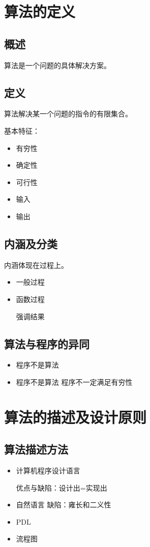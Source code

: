 \documentclass[AutoFakeBold]{LZUThesis2007}
\begin{document}
	\section{算法的定义}
		\subsection{概述}

			算法是一个问题的具体解决方案。

		\subsection{定义}

			算法解决某一个问题的指令的有限集合。

			基本特征：
				\begin{itemize}
					\item 有穷性
					\item 确定性
					\item 可行性
					\item 输入
					\item 输出
				\end{itemize}

		\subsection{内涵及分类}
			内涵体现在过程上。
				\begin{itemize}
					\item 一般过程
					\item 函数过程

						强调结果

				\end{itemize}

		\subsection{算法与程序的异同}
				\begin{itemize}
					\item 程序不是算法
					\item 程序不是算法 程序不一定满足有穷性
				\end{itemize}

	\section{算法的描述及设计原则}
		\subsection{算法描述方法}
			\begin{itemize}
				\item 计算机程序设计语言

					优点与缺陷：设计出=实现出

				\item 自然语言
					缺陷：雍长和二义性
				\item PDL
				\item 流程图
			\end{itemize}
\end{document}

